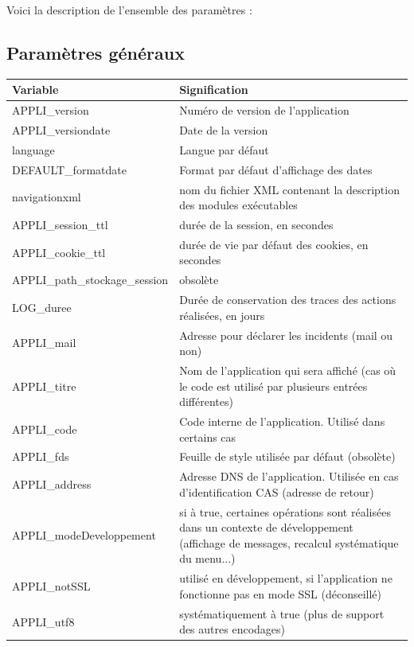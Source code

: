 Voici la description de l'ensemble des paramètres :

\subsection{Paramètres généraux}
\begin{longtable}{|p{5cm}|p{8cm}|}
\hline
\textbf{Variable} & \textbf{Signification} \\
\hline
\endhead
APPLI\_version & Numéro de version de l'application \\ 
\hline 
APPLI\_versiondate & Date de la version \\ 
\hline 
language & Langue par défaut \\
\hline
DEFAULT\_formatdate & Format par défaut d'affichage des dates\\
\hline
navigationxml & nom du fichier XML contenant la description des modules exécutables\\
\hline
APPLI\_session\_ttl & durée de la session, en secondes\\
\hline
APPLI\_cookie\_ttl & durée de vie par défaut des cookies, en secondes\\
\hline
APPLI\_path\_stockage\_session & obsolète\\
\hline
LOG\_duree & Durée de conservation des traces des actions réalisées, en jours\\
\hline
APPLI\_mail & Adresse pour déclarer les incidents (mail ou non)\\
\hline
APPLI\_titre & Nom de l'application qui sera affiché (cas où le code est utilisé par plusieurs entrées différentes) \\
\hline
APPLI\_code & Code interne de l'application. Utilisé dans certains cas\\
\hline
APPLI\_fds & Feuille de style utilisée par défaut (obsolète)\\
\hline
APPLI\_address & Adresse DNS de l'application. Utilisée en cas d'identification CAS (adresse de retour)\\
\hline
APPLI\_modeDeveloppement & si à true, certaines opérations sont réalisées dans un contexte de développement (affichage de messages, recalcul systématique du menu...)\\
\hline
APPLI\_notSSL & utilisé en développement, si l'application ne fonctionne pas en mode SSL (déconseillé) \\
\hline
APPLI\_utf8 & systématiquement à true (plus de support des autres encodages)\\

\end{longtable}
